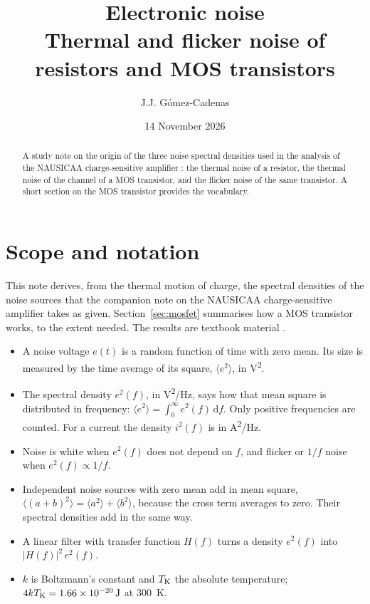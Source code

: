 \documentclass[11pt,a4paper]{article}
\title{Electronic noise\\[4pt]\large Thermal and flicker noise of resistors and MOS transistors}
\author{J.J. Gómez-Cadenas}
\date{14 November 2026}
\newcommand{\dd}{\mathrm{d}}
\begin{document}
\maketitle
\begin{abstract}
A study note on the origin of the three noise spectral densities used in the
analysis of the NAUSICAA charge-sensitive amplifier \citep{HerreroGarcia2026}:
the thermal noise of a resistor, the thermal noise of the channel of a MOS
transistor, and the flicker noise of the same transistor. A short section on
the MOS transistor provides the vocabulary.
\end{abstract}
\tableofcontents

\section{Scope and notation}
\label{sec:scope}
%
This note derives, from the thermal motion of charge, the spectral densities
of the noise sources that the companion note on the NAUSICAA
charge-sensitive amplifier \citep{HerreroGarcia2026} takes as given.
Section~\ref{sec:mosfet} summarises how a MOS transistor works, to the extent
needed. The results are textbook material
\citep{vanderZiel1986,Tsividis2011}.
%
\begin{itemize}
\item A noise voltage $e(t)$ is a random function of time with zero mean.
  Its size is measured by the time average of its square, $\langle
  e^2\rangle$, in \si{V^2}.
\item The spectral density $e^2(f)$, in \si{V^2/Hz}, says how that mean
  square is distributed in frequency: $\langle e^2\rangle=\int_0^\infty
  e^2(f)\,\dd f$. Only positive frequencies are counted. For a current the
  density $i^2(f)$ is in \si{A^2/Hz}.
\item Noise is white when $e^2(f)$ does not depend on $f$, and flicker or
  $1/f$ noise when $e^2(f)\propto1/f$.
\item Independent noise sources with zero mean add in mean square,
  $\langle(a+b)^2\rangle=\langle a^2\rangle+\langle b^2\rangle$, because the
  cross term averages to zero. Their spectral densities add in the same way.
\item A linear filter with transfer function $H(f)$ turns a density
  $e^2(f)$ into $|H(f)|^2\,e^2(f)$.
\item $k$ is Boltzmann's constant and $T_{\rm K}$ the absolute temperature;
  $4kT_{\rm K}=\SI{1.66e-20}{J}$ at \SI{300}{K}.
\end{itemize}
\end{document}
